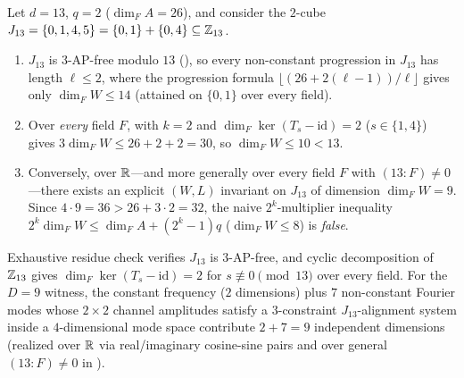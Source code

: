 \begin{example}[Sharpness of $(k+1)$ vs.\ $2^k$ on an AP-free $2$-cube at $d = 13$]\label{ex:d13-sharpness}
Let $d = 13$, $q = 2$ ($\dim_F A = 26$), and consider the $2$-cube
$J_{13} = \{0, 1, 4, 5\} = \{0,1\} + \{0,4\} \subseteq \mathbb{Z}_{13}$.
\begin{enumerate}[label=(\alph*)]
\item $J_{13}$ is $3$-AP-free modulo $13$ (), so every non-constant
  progression in $J_{13}$ has length $\ell \le 2$, where the progression formula
  $\lfloor(26 + 2(\ell - 1))/\ell\rfloor$ gives only $\dim_F W \le 14$ (attained on $\{0,1\}$ over
  every field).
\item Over \emph{every} field $F$,  with $k = 2$ and
  $\dim_F\ker(T_s - \mathrm{id}) = 2$ ($s \in \{1,4\}$) gives $3\dim_F W \le 26 + 2 + 2 = 30$, so
  $\dim_F W \le 10 < 13$.
\item Conversely, over $\mathbb{R}$---and more generally over every field $F$ with $(13 : F) \ne 0$---there
  exists an explicit $(W, L)$ invariant on $J_{13}$ of dimension $\dim_F W = 9$. Since
  $4 \cdot 9 = 36 > 26 + 3 \cdot 2 = 32$, the naive $2^k$-multiplier inequality
  $2^k \dim_F W \le \dim_F A + (2^k - 1)q$ ($\dim_F W \le 8$) is \emph{false}.
\end{enumerate}
\end{example}
\begin{outline}
Exhaustive residue check verifies $J_{13}$ is $3$-AP-free, and cyclic decomposition of $\mathbb{Z}_{13}$
gives $\dim_F\ker(T_s - \mathrm{id}) = 2$ for $s \not\equiv 0 \pmod{13}$ over every field. For the
$D = 9$ witness, the constant frequency ($2$ dimensions) plus $7$ non-constant Fourier modes whose
$2\times 2$ channel amplitudes satisfy a $3$-constraint $J_{13}$-alignment system inside a
$4$-dimensional mode space contribute $2 + 7 = 9$ independent dimensions (realized over $\mathbb{R}$ via
real/imaginary cosine-sine pairs and over general $(13 : F) \ne 0$ in
).
\end{outline}

